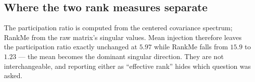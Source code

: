 \subsection{Where the two rank measures separate}

\established{} The participation ratio is computed from the centered covariance spectrum;
RankMe \citep{garrido2023rankme} from the raw matrix's singular values. Mean injection
therefore leaves the participation ratio exactly unchanged at $5.97$ while RankMe falls
from $15.9$ to $1.23$ --- the mean becomes the dominant singular direction. They are not
interchangeable, and reporting either as ``effective rank'' hides which question was
asked.
